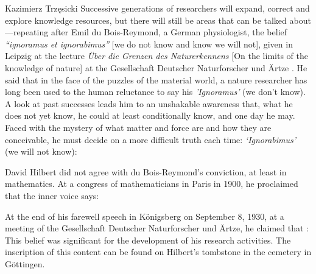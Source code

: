 \begin{artengenv}{Kazimierz Trzęsicki}
Successive generations of researchers will expand, correct and explore knowledge resources, but there will still be areas that can be talked about---repeating after Emil du Bois-Reymond, a German physiologist, the belief \emph{``ignoramus et ignorabimus''} [we do not know and know we will not], given in Leipzig at the lecture \emph{{\"U}ber die Grenzen des Naturerkennens} [On the limits of the knowledge of nature]  at the Gesellschaft Deutscher Naturforscher und {\"A}rtze \parencite{DuboisReymond1872,DuboisReymond1882}. He said that in the face of the puzzles of the material world, a nature researcher has long been used to the human reluctance to say his \emph{'Ignoramus'} (we don't know). A look at past successes leads him to an unshakable awareness that, what he does not yet know, he could at least conditionally know, and one day he may. Faced with the mystery of what matter and force are and how they are conceivable, he must decide on a more difficult truth each time: \emph{`Ignorabimus'} (we will not know): 

David Hilbert \parencite*{Hilbert1900} did not agree with du Bois-Reymond's conviction, at least in mathematics. At a congress of mathematicians in Paris in 1900, he proclaimed that the inner voice says: 

At the end of his farewell speech in Königsberg on September 8, 1930, at a meeting of the Gesellschaft Deutscher Naturforscher und {\"A}rtze, he claimed that \parencites[p.387] {Hilbert1935a}[see also][]{smith_david_2014}:  This belief was significant for the development of his research activities. The inscription of this content can be found on Hilbert's tombstone in the cemetery in G{\"o}ttingen.


\end{artengenv}
